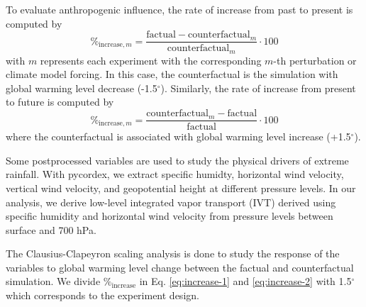 To evaluate anthropogenic influence, the rate of increase from past to present is computed by
\begin{equation} \label{eq:increase-1}
    \%_{\text{increase},m} = \frac{\text{factual} - \text{counterfactual}_m}{\text{counterfactual}_m} \cdot 100
\end{equation} 
with $m$ represents each experiment with the corresponding $m$-th perturbation or climate model forcing. In this case, the counterfactual is the simulation with global warming level decrease (-1.5$^\circ$). Similarly, the rate of increase from present to future is computed by
\begin{equation} \label{eq:increase-2}
    \%_{\text{increase},m} = \frac{\text{counterfactual}_m - \text{factual}}{\text{factual}} \cdot 100
\end{equation} 
where the counterfactual is associated with global warming level increase (+1.5$^\circ$).

Some postprocessed variables are used to study the physical drivers of extreme rainfall. With pycordex, we extract specific humidty, horizontal wind velocity, vertical wind velocity, and geopotential height at different pressure levels. In our analysis, we derive low-level integrated vapor transport (IVT) derived using specific humidity and horizontal wind velocity from pressure levels between surface and 700 hPa.

The Clausius-Clapeyron scaling analysis is done to study the response of the variables to global warming level change between the factual and counterfactual simulation. We divide $\%_{\text{increase}}$ in Eq. \eqref{eq:increase-1} and \eqref{eq:increase-2} with 1.5$^\circ$ which corresponds to the experiment design.